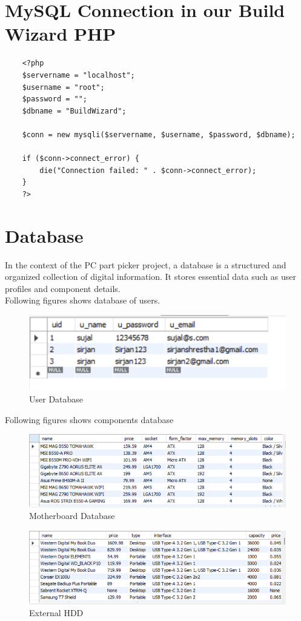 \section{MySQL Connection in our Build Wizard PHP}
\vspace{1cm}
\begin{lstlisting}
    <?php
    $servername = "localhost";
    $username = "root";
    $password = "";
    $dbname = "BuildWizard";

    $conn = new mysqli($servername, $username, $password, $dbname);

    if ($conn->connect_error) {
        die("Connection failed: " . $conn->connect_error);
    }
    ?>
    \end{lstlisting}
    \newpage
    \section{Database}
    In the context of the PC part picker project, a database is a structured and organized collection of digital information. It stores essential data such as user profiles and component details.\\
Following figures shows database of users.
\begin{figure}[H]
\includegraphics[width=15cm]{Diagrams/Users Database.png}
\caption{User Database}
\end{figure}
Following figures shows components database
\begin{figure}[H]
\includegraphics[width=16cm]{Diagrams/motherboard.png}
\caption{Motherboard Database}
\end{figure}
\begin{figure}[H]
\includegraphics[width=16cm]{Diagrams/External HDD.png}
\caption{External HDD}
\end{figure}

